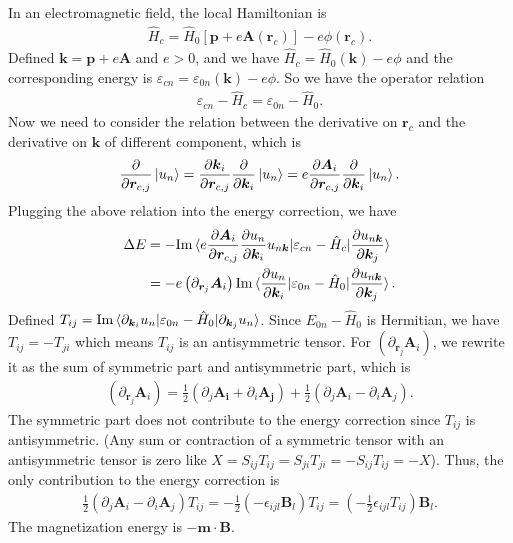 \documentclass[12pt, oneside]{article}
\newcommand{\pa}{\partial}
\newcommand{\mr}[1]{\mathrm{#1}}
\newcommand{\p}[1]{\left(#1\right)}
\newcommand{\bb}[1]{\left[#1\right]}
\numberwithin{equation}{subsection}
\begin{document}
In an electromagnetic field, the local Hamiltonian is 
\begin{align}
	\hat{H}_{c} = \hat{H}_0 \bb{\bm{p} + e \bm{A} \p{\bm{r}_c}} - e \phi \p{\bm{r}_c}.
\end{align}
Defined \(\bm{k} = \bm{p} + e \bm{A}\) and \(e > 0\), and we have \(\hat{H}_{c} = \hat{H}_0 \p{\bm{k}} - e \phi\) and the corresponding energy is \(\varepsilon_{cn} = \varepsilon_{0 n} \p{\bm{k}} - e \phi\). So we have the operator relation 
\begin{align}
	\varepsilon_{cn} - \hat{H}_c = \varepsilon_{0 n} - \hat{H}_0.
\end{align}
Now we need to consider the relation between the derivative on \(\bm{r}_c\) and the derivative on \(\bm{k}\) of different component, which is 
\begin{align}
	\frac{\pa}{\pa \bm{r}_{c,j}} \ket{u_n} = \frac{\pa \bm{k}_i}{\pa \bm{r}_{c,j}} \frac{\pa}{\pa \bm{k}_i} \ket{u_n} = e \frac{\pa \bm{A}_i}{\pa \bm{r}_{c,j}} \frac{\pa}{\pa \bm{k}_i} \ket{u_n}.
\end{align} 
Plugging the above relation into the energy correction, we have
\begin{align}
	\begin{split}
		\Delta E & = - \mr{Im} \braket{e \frac{\pa \bm{A}_i}{\pa \bm{r}_{c,j}} \frac{\pa u_n}{\pa \bm{k}_i} u_{n \bm{k}} | \varepsilon_{cn} - \hat{H}_c | \frac{\pa u_{n \bm{k}}}{\pa \bm{k}_j}} \\
		& = - e \p{\pa_{\bm{r}_j} \bm{A}_i} \mr{Im} \braket{\frac{\pa u_n}{\pa \bm{k}_i} | \varepsilon_{0 n} - \hat{H}_0 | \frac{\pa u_{n \bm{k}}}{\pa \bm{k}_j}}.
	\end{split}
\end{align}
Defined \(T_{ij} = \mr{Im} \braket{\pa_{\bm{k}_i} u_n |  \varepsilon_{0 n} - \hat{H}_0  | \pa_{\bm{k}_j} u_n}\). Since \( E_{0 n} - \hat{H}_0\) is Hermitian, we have \(T_{ij} = - T_{ji}\) which means \(T_{ij}\) is an antisymmetric tensor. For  \(\p{\pa_{\bm{r}_j} \bm{A}_i} \), we rewrite it as the sum of symmetric part and antisymmetric part, which is
\begin{align}
	\p{\pa_{\bm{r}_j} \bm{A}_i} = \frac12 \p{\pa_j \bm{A_i} + \pa_i \bm{A_j} }+ \frac{1}{2} \p{\pa_j \bm{A}_i - \pa_i \bm{A}_j}.
\end{align}
The symmetric part does not contribute to the energy correction since \(T_{ij}\) is antisymmetric. (Any sum or contraction of a symmetric tensor with an antisymmetric tensor is zero like \(X = S_{ij} T_{ij} = S_{ji} T_{ji} = -S_{ij}T_{ij} = -X\)). Thus, the only contribution to the energy correction is 
\begin{align}
	\frac{1}{2} \p{\pa_j \bm{A}_i - \pa_i \bm{A}_j} T_{ij} =  - \frac12 \p{- \epsilon_{ijl} \bm{B}_l} T_{ij} = \p{- \frac12 \epsilon_{ijl} T_{ij}} \bm{B}_l.
\end{align}
The magnetization energy is \(- \bm{m} \cdot \bm{B}\). 
\end{document}
